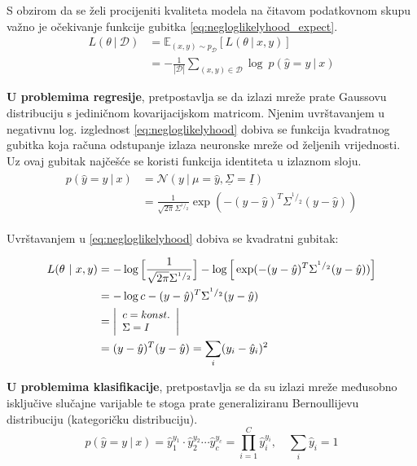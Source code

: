 \documentclass[times, utf8, numeric, diplomski]{fer}
\def\mat#1{\underline{#1}}
\def\expect{\mathbb{E}}
\def\normal{\mathcal{N}}
\def\probsep{\ |\ }
\def\dataset{\mathcal{D}}
\begin{document}
S obzirom da se želi procijeniti kvaliteta modela na čitavom podatkovnom skupu važno je očekivanje funkcije gubitka \eqref{eq:negloglikelyhood_expect}.
\begin{equation}
\label{eq:negloglikelyhood_expect}
\begin{split}
L(\theta \probsep \dataset) &= \expect_{(x,y) \sim p_\dataset}[L(\theta \probsep x,y)] \\
&= -\frac{1}{|\dataset|} \sum_{(x,y)\in\dataset} \log\ p(\hat{y}=y \probsep x)
\end{split}
\end{equation}

\textbf{U problemima regresije}, pretpostavlja se da izlazi mreže prate Gaussovu distribuciju s jediničnom kovarijacijskom matricom. Njenim uvrštavanjem u negativnu log. izglednost \eqref{eq:negloglikelyhood} dobiva se funkcija kvadratnog gubitka koja računa odstupanje izlaza neuronske mreže od željenih vrijednosti. Uz ovaj gubitak najčešće se koristi funkcija identiteta u izlaznom sloju.
\begin{align}
\label{eq:normal_dist}
\begin{split}
p(\hat{y}=y \probsep x) &= \normal(y \probsep \mu=\hat{y}, \mat{\Sigma}=\mat{I}) \\
&= \frac{1}{\sqrt{2\pi}\Sigma^{^1/_2}} \exp(-(y-\hat{y})^T\Sigma^{^1/_2}(y-\hat{y}))
\end{split}
\end{align}

Uvrštavanjem u \eqref{eq:negloglikelyhood} dobiva se kvadratni gubitak:

\begin{align}
\label{eq:loss_regression}
L(\theta \probsep x,y) &= - \log \Big[ \frac{1}{\sqrt{2\pi}\Sigma^{^1/_2}} \Big] - \log \Big[ \exp(-(y-\hat{y})^T\Sigma^{^1/_2}(y-\hat{y})) \Big] \nonumber \\
&= -\log c - (y-\hat{y})^T\Sigma^{^1/_2}(y-\hat{y}) \nonumber \\
&= \left|\footnotesize 
\begin{array}[c]{l} 
	c = konst. \\ 
	\Sigma = I 
\end{array}
\right| \nonumber \\
&= (y-\hat{y})^T(y-\hat{y}) = \sum_i (y_i - \hat{y}_i)^2
\end{align}

\textbf{U problemima klasifikacije}, pretpostavlja se da su izlazi mreže međusobno isključive slučajne varijable te stoga prate generaliziranu Bernoullijevu distribuciju (kategoričku distribuciju).
\begin{equation}
p(\hat{y}=y \probsep x) = \hat{y}_1^{y_1} \cdot \hat{y}_2^{y_2} \cdots \hat{y}_c^{y_c} 
= \prod_{i=1}^C \hat{y}_i^{y_i}, \quad \sum_i \hat{y}_i = 1
\end{equation}
\end{document}
